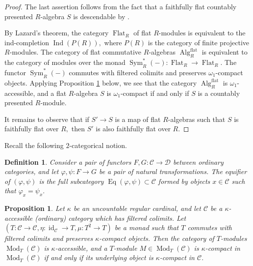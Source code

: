 \documentclass[11pt,leqno]{amsart}
\newtheorem{defi}[theo]{Definition}
\newtheorem{prop}[theo]{Proposition}
\numberwithin{equation}{section}
\newcommand{\Flat}{\operatorname{Flat}}
\newcommand{\fla}{\operatorname{flat}}
\newcommand{\cD}{{\mathcal D}}
\newcommand{\cC}{{\mathcal C}}
\newcommand{\Eq}{\operatorname{Eq}}
\newcommand{\Sym}{\operatorname{Sym}}
\newcommand{\Ind}{\operatorname{Ind}}
\newcommand{\Alg}{\operatorname{Alg}}
\newcommand{\id}{\operatorname{id}}
\newcommand{\Mod}{\operatorname{Mod}}
\begin{document}
\begin{proof} The last assertion follows from the fact that a faithfully flat countably presented $R$-algebra $S$ is descendable by \cite[Corollary 3.33]{Mat}.

By Lazard's theorem, the category $\Flat_R$ of flat $R$-modules is equivalent to the ind-completion $\Ind(P(R)),$ where $P(R)$ is the category of finite projective $R$-modules. The category of flat commutative $R$-algebras $\Alg^{\fla}_{R}$ is equivalent to the category of modules over the monad $\Sym_R^*(-):\Flat_R\to\Flat_R.$ The functor $\Sym_R^*(-)$ commutes with filtered colimits and preserves $\omega_1$-compact objects. Applying Proposition \ref{prop:modules_over_accessible_monads} below, we see that the category $\Alg^{\fla}_{R}$ is $\omega_1$-accessible, and a flat $R$-algebra $S$ is $\omega_1$-compact if and only if $S$ is a countably presented $R$-module.

It remains to observe that if $S'\to S$ is a map of flat $R$-algebras such that $S$ is faithfully flat over $R,$ then $S'$ is also faithfully flat over $R.$
\end{proof}

Recall the following $2$-categorical notion.

\begin{defi}\cite{AR} Consider a pair of functors $F,G:\cC\to\cD$ between ordinary categories, and let $\varphi,\psi:F\to G$ be a pair of natural transformations. The equifier of $(\varphi,\psi)$ is the full subcategory $\Eq(\varphi,\psi)\subset \cC$ formed by objects $x\in\cC$ such that $\varphi_x=\psi_x.$\end{defi}

\begin{prop}\label{prop:modules_over_accessible_monads} Let $\kappa$ be an uncountable regular cardinal, and let $\cC$ be a $\kappa$-accessible (ordinary) category which has filtered colimits. Let $(T:\cC\to\cC,\eta:\id_{\cC}\to T,\mu:T^2\to T)$ be a monad such that $T$ commutes with filtered colimits and preserves $\kappa$-compact objects. Then the category of $T$-modules $\Mod_T(\cC)$ is $\kappa$-accessible, and a $T$-module $M\in\Mod_T(\cC)$ is $\kappa$-compact in $\Mod_T(\cC)$ if and only if its underlying object is $\kappa$-compact in $\cC.$\end{prop}
\end{document}
